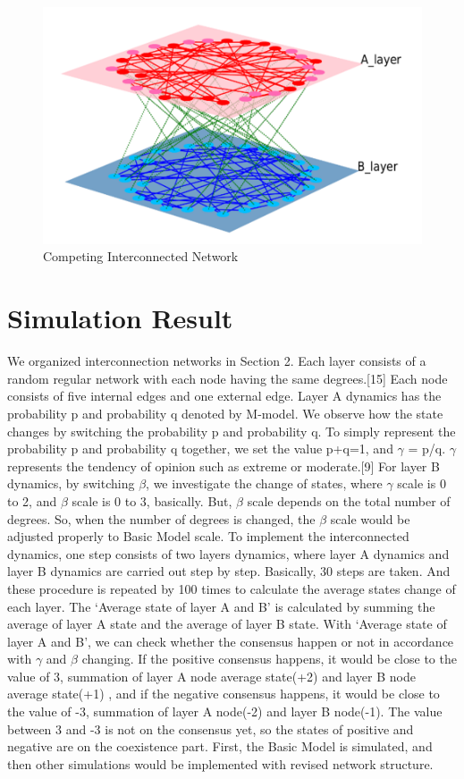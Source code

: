 \documentclass[english]{cccconf}
\begin{document}
\begin{figure}[!htb]
  \centering
  \includegraphics[width=\hsize]{FIG1.png}
  \caption{Competing Interconnected Network}
  \label{Fig1}
\end{figure}
\section{Simulation Result}
We organized interconnection networks in Section 2. Each layer consists of a random regular network with each node having the same degrees.[15] Each node consists of five internal edges and one external edge. Layer A dynamics has the probability p and probability q denoted by M-model. We observe how the state changes by switching the probability p and probability q. To simply represent the probability p and probability q together, we set the value p+q=1, and $\gamma$ = p/q. $\gamma$ represents the tendency of opinion such as extreme or moderate.[9] For layer B dynamics, by switching $\beta$, we investigate the change of states, where $\gamma$ scale is 0 to 2, and $\beta$ scale is 0 to 3, basically. But, $\beta$ scale depends on the total number of degrees. So, when the number of degrees is changed, the $\beta$ scale would be adjusted properly to Basic Model scale.
To implement the interconnected dynamics, one step consists of two layers dynamics, where layer A dynamics and layer B dynamics are carried out step by step. Basically, 30 steps are taken. And these procedure is repeated by 100 times to calculate the average states change of each layer.
The `Average state of layer A and B' is calculated by summing the average of layer A state and the average of layer B state. With `Average state of layer A and B', we can check whether the consensus happen or not in accordance with $\gamma$ and $\beta$ changing.  If the positive consensus happens, it would be close to the value of 3, summation of layer A node average state(+2) and layer B node average state(+1) , and if the negative consensus happens, it would be close to the value of -3, summation of layer A node(-2) and layer B node(-1). The value between 3 and -3 is not on the consensus yet, so the states of positive and negative are on the coexistence part.
First, the Basic Model is simulated, and then other simulations would be implemented with revised network structure.
\end{document}
